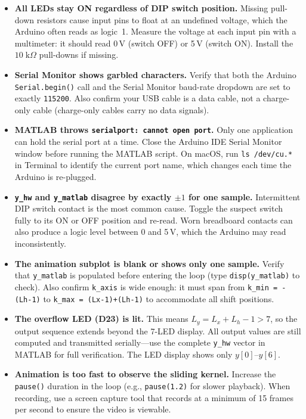 \documentclass[11pt,letterpaper]{article}
\begin{document}
\begin{itemize}
    \item \textbf{All LEDs stay ON regardless of DIP switch position.} Missing pull-down resistors cause input pins to float at an undefined voltage, which the Arduino often reads as logic~1. Measure the voltage at each input pin with a multimeter: it should read 0\,V (switch OFF) or 5\,V (switch ON). Install the $10\;\mathrm{k}\Omega$ pull-downs if missing.

    \item \textbf{Serial Monitor shows garbled characters.} Verify that both the Arduino \texttt{Serial.begin()} call and the Serial Monitor baud-rate dropdown are set to exactly \texttt{115200}. Also confirm your USB cable is a data cable, not a charge-only cable (charge-only cables carry no data signals).

    \item \textbf{MATLAB throws \texttt{serialport: cannot open port}.} Only one application can hold the serial port at a time. Close the Arduino IDE Serial Monitor window before running the MATLAB script. On macOS, run \texttt{ls /dev/cu.*} in Terminal to identify the current port name, which changes each time the Arduino is re-plugged.

    \item \textbf{\texttt{y\_hw} and \texttt{y\_matlab} disagree by exactly $\pm 1$ for one sample.} Intermittent DIP switch contact is the most common cause. Toggle the suspect switch fully to its ON or OFF position and re-read. Worn breadboard contacts can also produce a logic level between 0 and 5\,V, which the Arduino may read inconsistently.

    \item \textbf{The animation subplot is blank or shows only one sample.} Verify that \texttt{y\_matlab} is populated before entering the loop (type \texttt{disp(y\_matlab)} to check). Also confirm \texttt{k\_axis} is wide enough: it must span from \texttt{k\_min = -(Lh-1)} to \texttt{k\_max = (Lx-1)+(Lh-1)} to accommodate all shift positions.

    \item \textbf{The overflow LED (D23) is lit.} This means $L_y = L_x + L_h - 1 > 7$, so the output sequence extends beyond the 7-LED display. All output values are still computed and transmitted serially---use the complete \texttt{y\_hw} vector in MATLAB for full verification. The LED display shows only $y[0]$--$y[6]$.

    \item \textbf{Animation is too fast to observe the sliding kernel.} Increase the \texttt{pause()} duration in the loop (e.g., \texttt{pause(1.2)} for slower playback). When recording, use a screen capture tool that records at a minimum of 15 frames per second to ensure the video is viewable.
\end{itemize}
\end{document}
